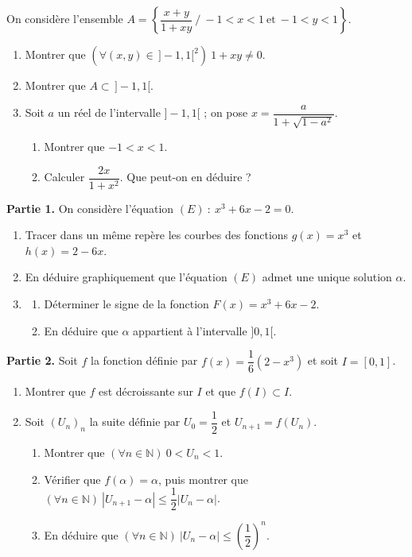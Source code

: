 On considère l'ensemble $A=\left\{\dfrac{x+y}{1+xy}\ /\ -1<x<1\ \text{et}\ -1<y<1\right\}$.
\begin{enumerate}
\item Montrer que $\left(\forall(x,y)\in\,]-1,1[^2\right)\ 1+xy\neq0$.
\item Montrer que $A\subset\,]-1,1[$.
\item Soit $a$ un réel de l'intervalle $]-1,1[$ ; on pose $x=\dfrac{a}{1+\sqrt{1-a^2}}$.
\begin{enumerate}
\item Montrer que $-1<x<1$.
\item Calculer $\dfrac{2x}{1+x^2}$. Que peut-on en déduire ?
\end{enumerate}
\end{enumerate}
\fin
{}
\textbf{Partie 1.} On considère l'équation $(E)\ :\ x^3+6x-2=0$.
\begin{enumerate}
\item Tracer dans un même repère les courbes des fonctions $g(x)=x^3$ et $h(x)=2-6x$.
\item En déduire graphiquement que l'équation $(E)$ admet une unique solution $\alpha$.
\item \begin{enumerate}
\item Déterminer le signe de la fonction $F(x)=x^3+6x-2$.
\item En déduire que $\alpha$ appartient à l'intervalle $]0,1[$.
\end{enumerate}
\end{enumerate}
\textbf{Partie 2.} Soit $f$ la fonction définie par $f(x)=\dfrac16\left(2-x^3\right)$ et soit $I=[0,1]$.
\begin{enumerate}
\item Montrer que $f$ est décroissante sur $I$ et que $f(I)\subset I$.
\item Soit $(U_n)_n$ la suite définie par $U_0=\dfrac12$ et $U_{n+1}=f(U_n)$.
\begin{enumerate}
\item Montrer que $(\forall n\in\mathbb{N})\ 0<U_n<1$.
\item Vérifier que $f(\alpha)=\alpha$, puis montrer que $(\forall n\in\mathbb{N})\ |U_{n+1}-\alpha|\leq\dfrac12|U_n-\alpha|$.
\item En déduire que $(\forall n\in\mathbb{N})\ |U_n-\alpha|\leq\left(\dfrac12\right)^n$.
\end{enumerate}
\end{enumerate}
\fin
